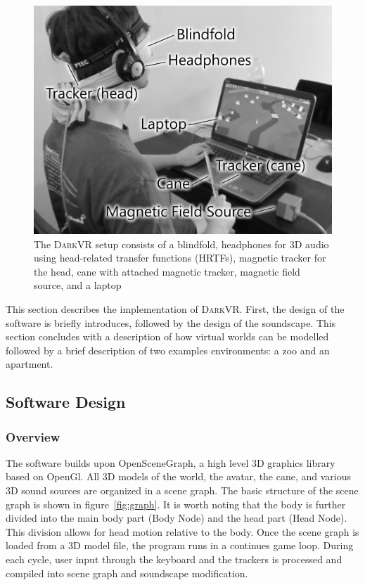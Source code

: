 \documentclass{sig-alternate}
\newcommand{\darkvr}{\textsc{DarkVR}\xspace}
\begin{document}
\begin{figure}
\centering
\includegraphics[width=\columnwidth]{images/details_sw}
\caption{The \darkvr setup consists of a blindfold, headphones for 3D audio
using head-related transfer functions (HRTFs), magnetic tracker for the head,
cane with attached magnetic tracker, magnetic field source, and a laptop}
\label{fig:setup}
\end{figure}

This section describes the implementation of \darkvr. First, the design of the
software is briefly introduces, followed by the design of the soundscape. This
section concludes with a description of how virtual worlds can be modelled
followed by a brief description of two examples environments: a zoo and an
apartment.

\subsection{Software Design}

\subsubsection{Overview}

The software builds upon OpenSceneGraph\cite{osg}, a high level 3D
graphics library based on OpenGl\cite{opengl}. All 3D models of the world, the avatar,
the cane, and various 3D sound sources are organized in a scene graph. The basic
structure of the scene graph is shown in figure~\ref{fig:graph}. It is worth
noting that the body is further divided into the main body part (Body Node) and
the head part (Head Node). This division allows for head motion relative to the
body. Once the scene graph is loaded from a 3D model file, the program runs in a
continues game loop. During each cycle, user input through the keyboard and the
trackers is processed and compiled into scene graph and soundscape modification.
\end{document}
